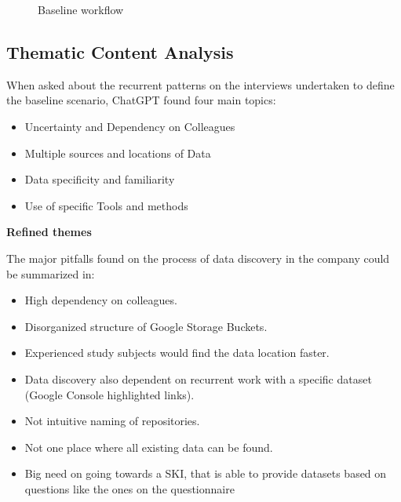 \documentclass[
  oneside,
  open=any]{scrbook}
\providecommand{\tightlist}{%
  \setlength{\itemsep}{0pt}\setlength{\parskip}{0pt}}\usepackage{longtable,booktabs,array}
\begin{document}
\begin{figure}[H]


\caption{\label{fig-baseline}Baseline workflow}

\end{figure}%

\subsection{Thematic Content Analysis}\label{thematic-content-analysis}

When asked about the recurrent patterns on the interviews undertaken to
define the baseline scenario, ChatGPT found four main topics:

\begin{itemize}
\tightlist
\item
  Uncertainty and Dependency on Colleagues
\item
  Multiple sources and locations of Data
\item
  Data specificity and familiarity
\item
  Use of specific Tools and methods
\end{itemize}

\textbf{Refined themes}

The major pitfalls found on the process of data discovery in the company
could be summarized in:

\begin{itemize}
\tightlist
\item
  High dependency on colleagues.
\item
  Disorganized structure of Google Storage Buckets.
\item
  Experienced study subjects would find the data location faster.
\item
  Data discovery also dependent on recurrent work with a specific
  dataset (Google Console highlighted links).
\item
  Not intuitive naming of repositories.
\item
  Not one place where all existing data can be found.
\item
  Big need on going towards a SKI, that is able to provide datasets
  based on questions like the ones on the questionnaire
\end{itemize}
\end{document}
